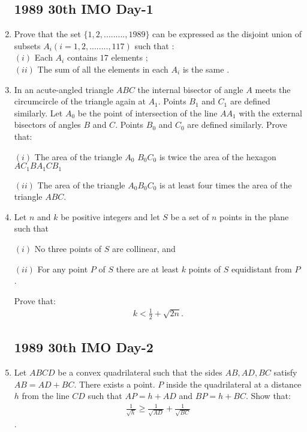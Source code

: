 \documentclass[12pt,-letter paper]{article}
\providecommand{\brak}[1]{\ensuremath{\left(#1\right)}}
\begin{document}
\begin{enumerate}


		\subsection*{1989  30th IMO Day-1}


\item Prove that the set $\{1,2,.........,1989\}$ can be expressed as the disjoint union of subsets $A_i$\brak{i=1,2,........,117} such that :\\
\brak{i} Each $A_i$ contains $17$ elements ;\\
\brak{ii} The sum of all the elements in each $A_i$ is the same .


\item In an acute-angled triangle $ABC$ the internal bisector of angle $A$ meets the circumcircle of the triangle again at $A_1$. Points $B_1$ and $C_1$ are defined similarly. Let $A_0$ be the point of intersection of the line $AA_1$ with the external bisectors of angles $B$ and $C$. Points $B_0$ and $C_0$ are defined similarly. Prove that:

\brak{i} The area of the triangle $A_0$ $B_0C_0$ is twice the area of the hexagon $AC_1BA_1CB_1$

\brak{ii} The area of the triangle $A_0B_0C_0$ is at least four times the area of the triangle $ABC$.

\item Let $n$ and $k$ be positive integers and let $S$ be a set of $n$ points in the plane such that

\brak{i} No three points of $S$ are collinear, and 

\brak{ii} For any point $P$ of $S$ there are at least $k$ points of $S$ equidistant from $P$.

		Prove that: \begin{align*}k < \frac{1}{2} + \sqrt{2n}.\end{align*}
 \subsection*{1989  30th IMO Day-2}

	\item Let $ABCD$ be a convex quadrilateral such that the sides ${AB, AD, BC}$ satisfy $AB= AD + BC$. There exists a point. $P$ inside the quadrilateral at a distance $h$ from the line $CD$ such that $AP= h+ AD$ and $BP= h + BC$. Show that:\begin{align*}
	\frac{1}{\sqrt{h}}\geq\frac{1}{\sqrt{AD}}+\frac{1}{\sqrt{BC}}\end{align*}.



\end{enumerate}
\end{document}
